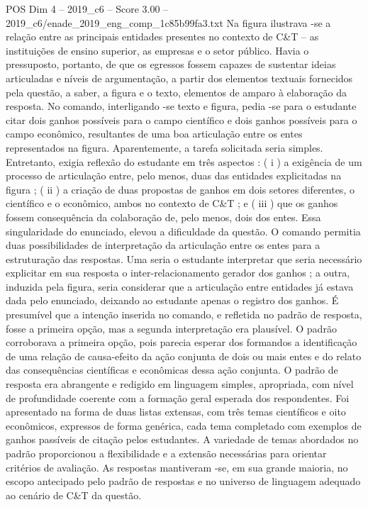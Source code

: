 \begin{textsample}{POS Dim 4 – 2019\_c6 – Score 3.00 – 2019\_c6/enade\_2019\_eng\_comp\_1c85b99fa3.txt}
Na figura ilustrava -se a relação entre as principais entidades presentes no contexto de C\&T – as instituições de ensino superior, as empresas e o setor público.
Havia o pressuposto, portanto, de que os egressos fossem capazes de sustentar ideias articuladas e níveis de argumentação, a partir dos elementos textuais fornecidos pela questão, a saber, a figura e o texto, elementos de amparo à elaboração da resposta.
No comando, interligando -se texto e figura, pedia -se para o estudante citar dois ganhos possíveis para o campo científico e dois ganhos possíveis para o campo econômico, resultantes de uma boa articulação entre os entes representados na figura.
Aparentemente, a tarefa solicitada seria simples.
Entretanto, exigia reflexão do estudante em três aspectos : ( i ) a exigência de um processo de articulação entre, pelo menos, duas das entidades explicitadas na figura ; ( ii ) a criação de duas propostas de ganhos em dois setores diferentes, o científico e o econômico, ambos no contexto de C\&T ; e ( iii ) que os ganhos fossem consequência da colaboração de, pelo menos, dois dos entes.
Essa singularidade do enunciado, elevou a dificuldade da questão.
O comando permitia duas possibilidades de interpretação da articulação entre os entes para a estruturação das respostas.
Uma seria o estudante interpretar que seria necessário explicitar em sua resposta o inter-relacionamento gerador dos ganhos ; a outra, induzida pela figura, seria considerar que a articulação entre entidades já estava dada pelo enunciado, deixando ao estudante apenas o registro dos ganhos.
É presumível que a intenção inserida no comando, e refletida no padrão de resposta, fosse a primeira opção, mas a segunda interpretação era plausível.
O padrão corroborava a primeira opção, pois parecia esperar dos formandos a identificação de uma relação de causa-efeito da ação conjunta de dois ou mais entes e do relato das consequências científicas e econômicas dessa ação conjunta.
O padrão de resposta era abrangente e redigido em linguagem simples, apropriada, com nível de profundidade coerente com a formação geral esperada dos respondentes.
Foi apresentado na forma de duas listas extensas, com três temas científicos e oito econômicos, expressos de forma genérica, cada tema completado com exemplos de ganhos passíveis de citação pelos estudantes.
A variedade de temas abordados no padrão proporcionou a flexibilidade e a extensão necessárias para orientar critérios de avaliação.
As respostas mantiveram -se, em sua grande maioria, no escopo antecipado pelo padrão de respostas e no universo de linguagem adequado ao cenário de C\&T da questão.

\end{textsample}
